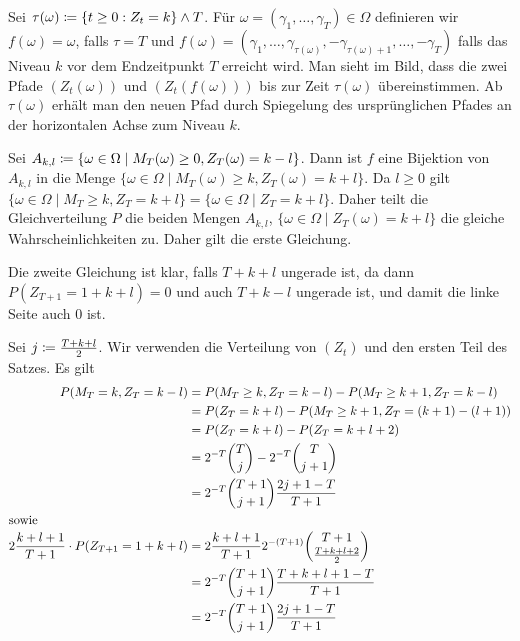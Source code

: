 \documentclass[a4paper,twoside,DIV15,BCOR12mm]{scrbook}
\begin{document}
\begin{center}
\end{center}
\begin{beweis}
Sei $\tau(\omega) \da \{ t\ge 0: Z_t = k\} \wedge T$. Für $\omega=(\gamma_1,\ldots,\gamma_T)\in \Omega$ definieren wir $f(\omega) = \omega$, falls $\tau = T$ und $f(\omega) = (\gamma_1,\ldots,\gamma_{\tau(\omega)},-\gamma_{\tau(\omega)+1},\ldots,-\gamma_T)$ falls das Niveau $k$ vor dem Endzeitpunkt $T$ erreicht wird. Man sieht im Bild, dass die zwei Pfade $(Z_t(\omega))$ und $(Z_t(f(\omega)))$ bis zur Zeit $\tau(\omega)$ übereinstimmen. Ab $\tau(\omega)$ erhält man den neuen Pfad durch Spiegelung des ursprünglichen Pfades an der horizontalen Achse zum Niveau $k$.

Sei $A_{k,l} \da \{\omega\in\Omega\mid M_T(\omega) \ge 0, Z_T(\omega) = k -l\}$. Dann ist $f$ eine Bijektion von $A_{k,l}$ in die Menge $\{\omega\in\Omega\mid M_T(\omega) \ge k, Z_T(\omega) = k + l\}$. Da $l\ge 0$ gilt $\{\omega\in\Omega\mid M_T\ge k, Z_T = k+l\} = \{\omega\in\Omega\mid Z_T = k+l\}$. Daher teilt die Gleichverteilung $P$ die beiden Mengen $A_{k,l}$, $\{\omega\in\Omega\mid Z_T(\omega) = k+l\}$ die gleiche Wahrscheinlichkeiten zu. Daher gilt die erste Gleichung.

Die zweite Gleichung ist klar, falls $T + k + l$ ungerade ist, da dann $P(Z_{T+1} = 1 + k + l) = 0$ und auch $T+k-l$ ungerade ist, und damit die linke Seite auch $0$ ist.

Sei $j \da\frac{T+k+l}2$.  Wir verwenden die Verteilung von $(Z_t)$ und den ersten Teil des Satzes.  Es gilt
\begin{align*}
P(M_T=k,Z_T = k-l) &= P(M_T\ge k, Z_T = k-l) - P(M_T\ge k+1 , Z_T = k-l) \\
&= P(Z_T = k+l) - P(M_T \ge k+1, Z_T=(k+1)-(l+1)) \\
&= P(Z_T = k+l) - P(Z_T = k+l+2) \\
&= 2^{-T} \binom{T}{j} - 2^{-T} \binom{T}{j+1} \\
&= 2^{-T} \binom{T+1}{j+1} \frac{2j+1-T}{T+1} \\
\intertext{sowie}
2 \frac{k+l+1}{T+1} \cdot P (Z_{T+1} = 1 + k +l) &= 2\frac{k+l+1}{T+1} 2^{-(T+1)} \binom{T+1}{\frac{T+k+l+2}2} \\
&= 2^{-T} \binom{T+1}{j+1}\frac{T+k+l+1-T}{T+1}  \\
&= 2^{-T} \binom{T+1}{j+1}\frac{2j+1-T}{T+1} 
\end{align*}
\end{beweis}
\end{document}
